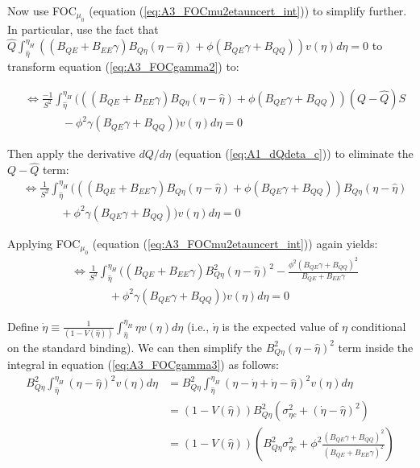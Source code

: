 \documentclass[12pt]{article}
\begin{document}
Now use FOC$_{\mu_0}$ (equation (\ref{eq:A3_FOCmu2etauncert_int})) to simplify further. In particular, use the fact that $\hat{Q}\int_{\hat{\eta}}^{\eta_H}\left((B_{QE}+B_{EE}\gamma)B_{Q\eta}(\eta-\hat{\eta}) + \phi(B_{QE}\gamma+B_{QQ})\right)v(\eta)d\eta = 0$ to transform equation (\ref{eq:A3_FOCgamma2}) to:

\begin{align}
&\Leftrightarrow \frac{-1}{S^2}\int_{\hat{\eta}}^{\eta_H}(((B_{QE}+B_{EE}\gamma)B_{Q\eta}(\eta-\hat{\eta}) + \phi(B_{QE}\gamma+B_{QQ}))(Q-\hat{Q})S \nonumber \\
& \hspace{40pt} - \phi^2\gamma(B_{QE}\gamma+B_{QQ}))v(\eta)d\eta = 0
\end{align}

Then apply the derivative $dQ/d\eta$ (equation (\ref{eq:A1_dQdeta_c})) to eliminate the $Q-\hat{Q}$ term:
\begin{align}
&\Leftrightarrow \frac{1}{S^2}\int_{\hat{\eta}}^{\eta_H}(((B_{QE}+B_{EE}\gamma)B_{Q\eta}(\eta-\hat{\eta}) + \phi(B_{QE}\gamma+B_{QQ}))B_{Q\eta}(\eta-\hat{\eta}) \nonumber \\
& \hspace{40pt} + \phi^2\gamma(B_{QE}\gamma+B_{QQ}))v(\eta)d\eta = 0
\end{align}

Applying FOC$_{\mu_0}$ (equation (\ref{eq:A3_FOCmu2etauncert_int})) again yields:
\begin{align}
&\Leftrightarrow \frac{1}{S^2}\int_{\hat{\eta}}^{\eta_H}((B_{QE}+B_{EE}\gamma)B_{Q\eta}^2(\eta-\hat{\eta})^2 - \frac{\phi^2(B_{QE}\gamma+B_{QQ})^2}{B_{QE}+B_{EE}\gamma} \nonumber \\
& \hspace{40pt} + \phi^2\gamma(B_{QE}\gamma+B_{QQ}))v(\eta)d\eta = 0 \label{eq:A3_FOCgamma3}
\end{align}

Define $\dot{\eta}\equiv\frac{1}{(1-V(\hat{\eta}))}\int_{\hat{\eta}}^{\eta_H}\eta v(\eta)d\eta$ (i.e., $\dot{\eta}$ is the expected value of $\eta$ conditional on the standard binding). We can then simplify the $B_{Q\eta}^2(\eta-\hat{\eta})^2$ term inside the integral in equation (\ref{eq:A3_FOCgamma3}) as follows:
\begin{align}
B_{Q\eta}^2\int_{\hat{\eta}}^{\eta_H}(\eta-\hat{\eta})^2v(\eta)d\eta &= B_{Q\eta}^2\int_{\hat{\eta}}^{\eta_H}(\eta-\dot{\eta}+\dot{\eta}-\hat{\eta})^2v(\eta)d\eta \nonumber \\
&= (1-V(\hat{\eta}))B_{Q\eta}^2(\sigma_{\eta c}^2 + (\dot{\eta}-\hat{\eta})^2) \nonumber \\
&= (1-V(\hat{\eta}))\left(B_{Q\eta}^2\sigma_{\eta c}^2 + \phi^2\frac{(B_{QE}\gamma+B_{QQ})^2}{(B_{QE}+B_{EE}\gamma)^2}\right) \label{eq:A3_Intval}
\end{align}
\end{document}
